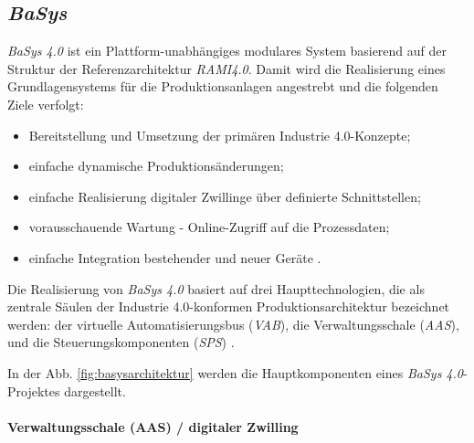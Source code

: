 



\subsection{\textit{BaSys}}

\textit{BaSys 4.0} ist ein Plattform-unabhängiges modulares System basierend auf der Struktur der Referenzarchitektur \textit{RAMI4.0}. Damit wird die Realisierung eines Grundlagensystems für die Produktionsanlagen angestrebt und die folgenden Ziele verfolgt: 
\begin{itemize}
    \item  Bereitstellung und Umsetzung der primären Industrie 4.0-Konzepte;
    \item einfache dynamische Produktionsänderungen;
    \item einfache Realisierung digitaler Zwillinge über definierte Schnittstellen; 
    \item vorausschauende Wartung - Online-Zugriff auf die Prozessdaten;
    \item einfache Integration bestehender und neuer Geräte \cite{chourtsidisScopingIndustryReconfigurability2020}.
\end{itemize}
Die Realisierung von \textit{BaSys 4.0} basiert auf drei Haupttechnologien, die als zentrale Säulen der Industrie 4.0-konformen Produktionsarchitektur bezeichnet werden: der virtuelle Automatisierungsbus (\textit{VAB}), die Verwaltungsschale (\textit{AAS}), und die Steuerungskomponenten (\textit{SPS}) \cite{chourtsidisScopingIndustryReconfigurability2020}.

In der Abb. \ref{fig:basysarchitektur} werden die Hauptkomponenten eines \textit{BaSys 4.0}-Projektes dargestellt.






\paragraph{Verwaltungsschale (AAS) / digitaler Zwilling}

